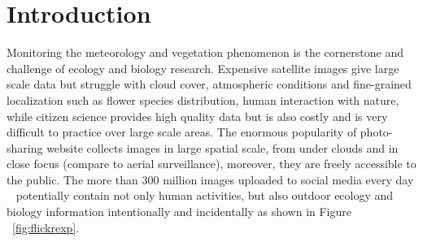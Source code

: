 \section{Introduction}

Monitoring the meteorology and vegetation phenomenon is the cornerstone and challenge of ecology and biology research. Expensive satellite images give large scale data but struggle with cloud cover, 
atmospheric conditions and fine-grained localization such as flower species distribution, human interaction with nature,
while citizen science provides high quality data but is also costly and is very difficult to practice over large scale areas.
The enormous popularity of photo-sharing website collects images in large spatial scale, from under clouds and in close focus (compare to aerial surveillance), 
moreover, they are freely accessible to the public.
The more than 300 million images uploaded to social media every day ~\cite{facebookstatistics}
 potentially contain not only human activities, but also outdoor ecology and biology 
information intentionally and incidentally as shown in Figure ~\ref{fig:flickrexp}.

